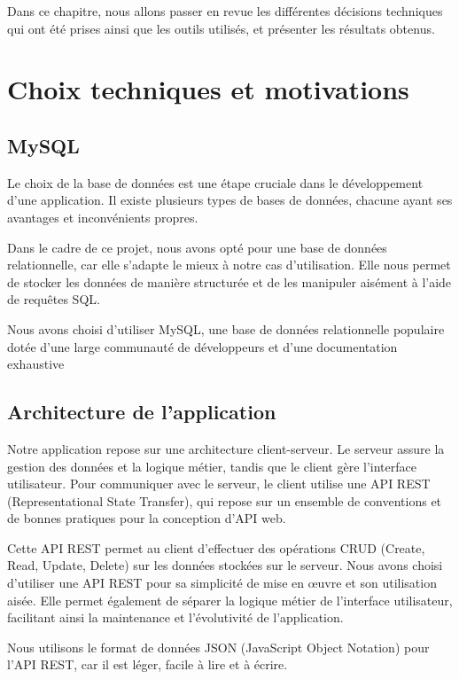 Dans ce chapitre, nous allons passer en revue les différentes décisions techniques qui ont été prises ainsi que les outils utilisés, et présenter les résultats obtenus.

\section{Choix techniques et motivations}\label{sec: conception-choix-techniques-et-motivation}
\subsection*{MySQL}\label{subsec:conception-mysql}
Le choix de la base de données est une étape cruciale dans le développement d'une application. Il existe plusieurs types de bases de données, chacune ayant ses avantages et inconvénients propres.

Dans le cadre de ce projet, nous avons opté pour une base de données relationnelle, car elle s'adapte le mieux à notre cas d'utilisation. Elle nous permet de stocker les données de manière structurée et de les manipuler aisément à l'aide de requêtes SQL.

Nous avons choisi d'utiliser MySQL, une base de données relationnelle populaire dotée d'une large communauté de développeurs et d'une documentation exhaustive


\subsection*{Architecture de l'application}\label{subsec: conception-application-architecture}
Notre application repose sur une architecture client-serveur. Le serveur assure la gestion des données et la logique métier, tandis que le client gère l'interface utilisateur. Pour communiquer avec le serveur, le client utilise une API REST (Representational State Transfer), qui repose sur un ensemble de conventions et de bonnes pratiques pour la conception d'API web.

Cette API REST permet au client d'effectuer des opérations CRUD (Create, Read, Update, Delete) sur les données stockées sur le serveur. Nous avons choisi d'utiliser une API REST pour sa simplicité de mise en œuvre et son utilisation aisée. Elle permet également de séparer la logique métier de l'interface utilisateur, facilitant ainsi la maintenance et l'évolutivité de l'application.

Nous utilisons le format de données JSON (JavaScript Object Notation) pour l'API REST, car il est léger, facile à lire et à écrire.
